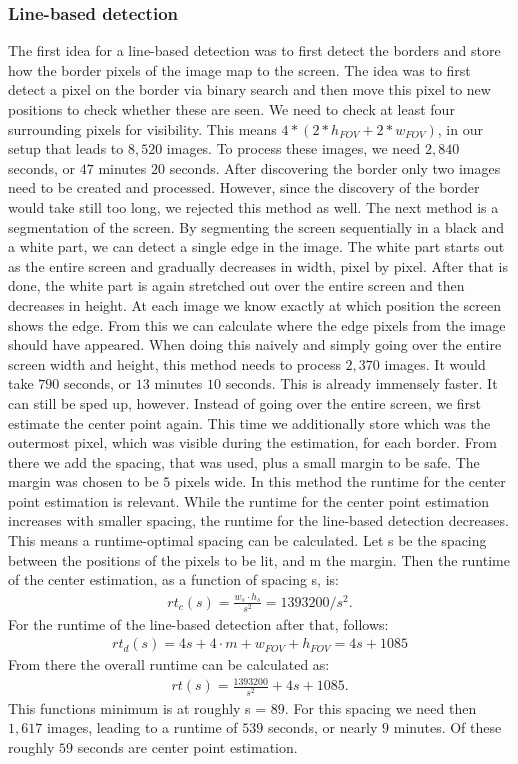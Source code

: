 \documentclass[journal,final,a4paper,twoside]{PS}
\begin{document}
\subsubsection{Line-based detection} 
\label{sec:linebased}
The first idea for a line-based detection was to first detect the borders and store how the border pixels of the image map to the screen. The idea was to first detect a pixel on the border via binary search and then move this pixel to new positions to check whether these are seen. We need to check at least four surrounding pixels for visibility. This means $4 * (2 * h_{FOV} + 2 * w_{FOV})$, in our setup that leads to $8,520$ images. To process these images, we need $2,840$ seconds, or $47$ minutes $20$ seconds. After discovering the border only two images need to be created and processed. However, since the discovery of the border would take still too long, we rejected this method as well.
The next method is a segmentation of the screen. By segmenting the screen sequentially in a black and a white part, we can detect a single edge in the image. The white part starts out as the entire screen and gradually decreases in width, pixel by pixel. After that is done, the white part is again stretched out over the entire screen and then decreases in height. At each image we know exactly at which position the screen shows the edge. From this we can calculate where the edge pixels from the image should have appeared.
When doing this naively and simply going over the entire screen width and height, this method needs to process $2,370$ images. It would take $790$ seconds, or $13$ minutes $10$ seconds. This is already immensely faster. It can still be sped up, however.
Instead of going over the entire screen, we first estimate the center point again. This time we additionally store which was the outermost pixel, which was visible during the estimation, for each border. From there we add the spacing, that was used, plus a small margin to be safe. The margin was chosen to be $5$ pixels wide. In this method the runtime for the center point estimation is relevant. While the runtime for the center point estimation increases with smaller spacing, the runtime for the line-based detection decreases. This means a runtime-optimal spacing can be calculated.
Let s be the spacing between the positions of the pixels to be lit, and m the margin. Then the runtime of the center estimation, as a function of spacing s, is:
\begin{align}
rt_c (s) = \frac{w_s\cdot h_s}{ s^2} = 1393200 / s^2.
\end{align}
For the runtime of the line-based detection after that, follows:
\begin{align}
rt_d (s) = 4s + 4\cdot m + w_{FOV} + h_{FOV} = 4s + 1085
\end{align}
From there the overall runtime can be calculated as:
\begin{align}
rt(s) = \frac{1393200}{s^2} + 4s +1085.
\end{align}
This functions minimum is at roughly s = 89. For this spacing we need then $1,617$ images, leading to a runtime of $539$ seconds, or nearly $9$ minutes. Of these roughly $59$ seconds are center point estimation.
\end{document}
